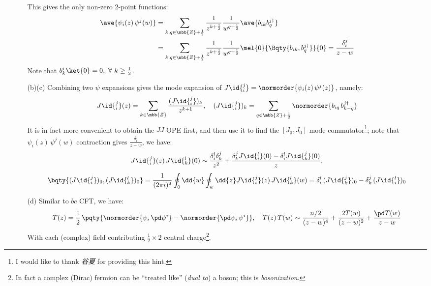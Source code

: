 \documentclass[a4paper,10pt]{article}
\begin{document}
\begin{enumerate}
\begin{enumerate}
	This gives the only non-zero 2-point functions:
	\begin{equation}
	\begin{aligned}
		\ave{
			\psi_i(z)\,\psi^j(w)
		}
		&= \sum_{k,q\in\mbb{Z}+\frac{1}{2}}
			\frac{1}{z^{k+\frac{1}{2}}}
			\frac{1}{w^{q+\frac{1}{2}}}
			\ave{b_{ik} b^{j\dagger}_q} \\
		&= \sum_{k,q\in\mbb{Z}+\frac{1}{2}}
			\frac{1}{z^{k+\frac{1}{2}}}
			\frac{1}{w^{q+\frac{1}{2}}}
			\mel{0}{
				\Bqty{b_{ik},b^{j\dagger}_q}
			}{0}
		= \frac{\delta^j_i}{z-w}
	\end{aligned}
	\end{equation}
	Note that $
		b^i_k\ket{0} = 0,\ %
		\forall\ k\ge\frac{1}{2}
	$. 
	
	\item[(b)(c)] Combining two $\psi$ expansions gives the mode expansion of $
		J\id{_i^j}
		= \normorder{\psi_i(z)\,\psi^j(z)}
	$, namely:
	\begin{equation}
		J\id{_i^j}(z)
		= \sum_{k\in\mbb{Z}}
			\frac{(J\id{_i^j})_k}{z^{k+1}},\quad
		(J\id{_i^j})_k
		= \sum_{q\in\mbb{Z}+\frac{1}{2}}
			\normorder{
				b_{iq}\,b^{j\dagger}_{k-q}
			}
	\end{equation}
	It is in fact more convenient to obtain the $JJ$ OPE first, and then use it to find the  $[J_0,J_0]$ mode commutator\footnote{
		I would like to thank \textit{谷夏} for providing this hint. 
	}; note that $
		{
			{\psi}_i(z)\,{\psi}^j(w)
		}
	$ contraction gives $\frac{\delta^j_i}{z-w}$, we have:
	\begin{gather}
		J\id{_i^j}(z)\,J\id{_k^l}(0)
		\sim \frac{
			\delta_i^l\delta_k^j
		}{z^2} + \frac{
			\delta^j_k J\id{_i^l}(0)
			- \delta^l_i J\id{_k^j}(0)
		}{z},\\[1ex]
		\bqty{
			(J\id{_i^j})_0, (J\id{_k^l})_0
		}
		= \frac{1}{(2\pi i)^2}
			\oint_0 \dd{w}
			\oint_w \dd{z}
				J\id{_i^j}(z)\,J\id{_k^l}(w)
		= \delta_i^l\,(J\id{_k^j})_0
			- \delta_k^j\,(J\id{_i^l})_0
	\end{gather}
	
	\item[(d)] Similar to $bc$ CFT, we have:
	\begin{equation}
		T(z) = \frac{1}{2}\,\pqty{
			\normorder{\psi_i\,\pd\psi^i}
			- \normorder{\pd\psi_i\,\psi^i}
		},\quad
		T(z)\,T(w)
		\sim \frac{n/2}{(z-w)^4}
			+ \frac{2T(w)}{(z-w)^2}
			+ \frac{\pd T(w)}{z-w}
	\end{equation}
	With each (complex) field contributing $\frac{1}{2}\times 2$ central charge\footnote{
		In fact a complex (Dirac) fermion can be ``treated like'' (\textit{dual to}) a boson; this is \textit{bosonization}. 
	}. 
	

\end{enumerate}
\end{enumerate}
\end{document}
